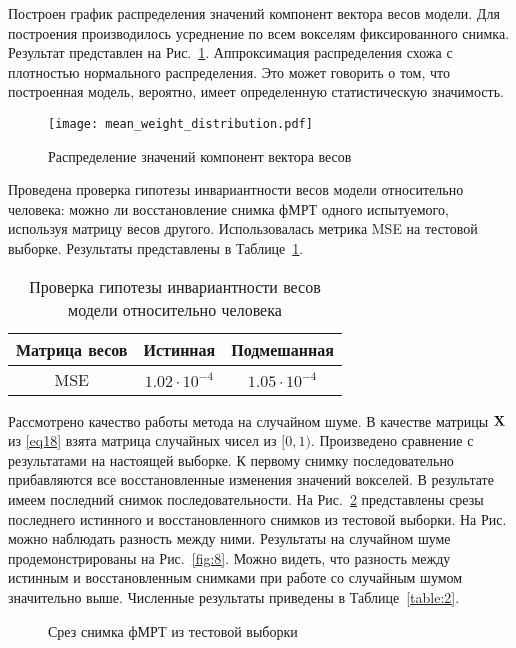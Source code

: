 \documentclass[a4paper, 12pt]{article}
\begin{document}
	Построен график распределения значений компонент вектора весов модели.
	Для построения производилось усреднение по всем вокселям фиксированного снимка.
	Результат представлен на Рис.~\ref{fig:6}.
	Аппроксимация распределения схожа с плотностью нормального распределения.
	Это может говорить о том, что построенная модель, вероятно, имеет определенную
	статистическую значимость.

	\begin{figure}[h!]
		\centering
		\texttt{[image: mean\_weight\_distribution.pdf]}
		\caption{Распределение значений компонент вектора весов}
		\label{fig:6}
	\end{figure}

	Проведена проверка гипотезы инвариантности весов модели относительно человека:
	можно ли восстановление снимка фМРТ одного испытуемого, используя
	матрицу весов другого. Использовалась метрика MSE на тестовой выборке.
	Результаты представлены в Таблице~\ref{table:1}.

	\begin{table}[h!]
		\centering
		\begin{tabular}{|c|c|c|}
			\hline
			Матрица весов	&	Истинная	&	Подмешанная \\ \hline \hline
			MSE		& 	$1.02 \cdot 10^{-4}$	 &		$1.05 \cdot 10^{-4}$ \\ \hline
		\end{tabular}
		\caption{Проверка гипотезы инвариантности весов модели относительно человека}
		\label{table:1}
	\end{table}

	Рассмотрено качество работы метода на случайном шуме. В качестве матрицы $\mathbf{X}$ из \eqref{eq18}
	взята матрица случайных чисел из $[0, 1)$. Произведено сравнение с результатами на настоящей
	выборке. К первому снимку последовательно прибавляются все восстановленные изменения значений
	вокселей. В результате имеем последний снимок последовательности. На Рис.~\ref*{fig:7}
	представлены срезы последнего истинного и восстановленного снимков из тестовой выборки. 
	На Рис. можно наблюдать разность между ними.
	Результаты на случайном шуме продемонстрированы на Рис.~\ref*{fig:8}.
	Можно видеть, что разность между истинным и восстановленным снимками при работе со случайным шумом
	значительно выше. Численные результаты приведены в Таблице~\ref{table:2}.

	\begin{figure}[h!]
		\centering
		\hfill
		\hfill
		\caption{Срез снимка фМРТ из тестовой выборки}
		\label{fig:7}
	\end{figure}
\end{document}
